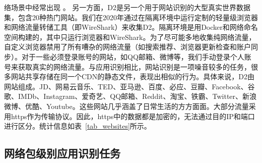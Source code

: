 \documentclass[degree=master,cjk-font=noto]{thuthesis}
\begin{document}
络场景中经常出现 。
另一方面，D2是另一个用于网站识别的大型真实世界数据集，包含20种热门网站。我们在2020年通过在隔离环境中运行定制的轻量级浏览器和网络流量转储工具（即WireShark）来收集D2。隔离环境是用Docker和网络命名空间构建的，其中只运行浏览器和WireShark。为了尽可能多地收集纯网络流量，自定义浏览器禁用了所有嘈杂的网络流量（如搜索推荐、浏览器更新检查和账户同步）。对于一些必须登录账号的网站，如QQ邮箱、微博等，我们手动登录个人账号来获取真实的网络流量。与应用识别相比，网站识别是一项噪音较多的任务，很多网站共享存储在同一个CDN的静态文件，表现出相似的行为。具体来说，D2由网站组成。JD、网易云音乐、TED、亚马逊、百度、必应、豆瓣、Facebook、谷歌、IMDb、Instagram、爱奇艺、QQ邮箱、Reddit、淘宝、铁霸、Twitter、新浪微博、优酷、Youtube。这些网站几乎涵盖了日常生活的方方面面。大部分流量采用https作为传输协议。因此，https中的数据都是加密的，无法通过目的IP和端口进行区分。统计信息如表~\ref{tab_websites}所示。

\subsection{网络包级别应用识别任务}
\end{document}
